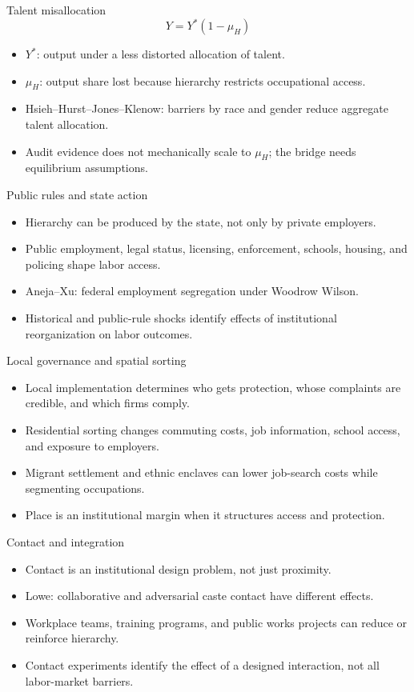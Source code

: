 \documentclass[aspectratio=169,11pt]{beamer}
\begin{document}
\begin{frame}{Talent misallocation}
\[
Y = Y^*(1 - \mu_H)
\]
\begin{itemize}
    \item $Y^*$: output under a less distorted allocation of talent.
    \item $\mu_H$: output share lost because hierarchy restricts occupational access.
    \item Hsieh--Hurst--Jones--Klenow: barriers by race and gender reduce aggregate talent allocation.
    \item Audit evidence does not mechanically scale to $\mu_H$; the bridge needs equilibrium assumptions.
\end{itemize}
\end{frame}

\begin{frame}{Public rules and state action}
\begin{itemize}
    \item Hierarchy can be produced by the state, not only by private employers.
    \item Public employment, legal status, licensing, enforcement, schools, housing, and policing shape labor access.
    \item Aneja--Xu: federal employment segregation under Woodrow Wilson.
    \item Historical and public-rule shocks identify effects of institutional reorganization on labor outcomes.
\end{itemize}
\end{frame}

\begin{frame}{Local governance and spatial sorting}
\begin{itemize}
    \item Local implementation determines who gets protection, whose complaints are credible, and which firms comply.
    \item Residential sorting changes commuting costs, job information, school access, and exposure to employers.
    \item Migrant settlement and ethnic enclaves can lower job-search costs while segmenting occupations.
    \item Place is an institutional margin when it structures access and protection.
\end{itemize}
\end{frame}

\begin{frame}{Contact and integration}
\begin{itemize}
    \item Contact is an institutional design problem, not just proximity.
    \item Lowe: collaborative and adversarial caste contact have different effects.
    \item Workplace teams, training programs, and public works projects can reduce or reinforce hierarchy.
    \item Contact experiments identify the effect of a designed interaction, not all labor-market barriers.
\end{itemize}
\end{frame}
\end{document}
